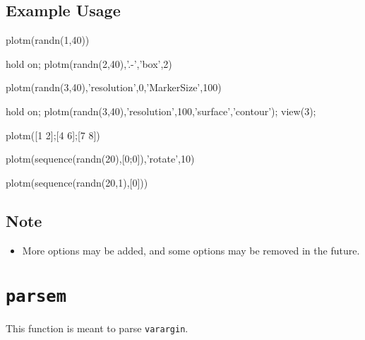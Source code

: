 \subsection*{Example Usage}
\begin{param}
\item[{plotm(randn(1,40))}] 
\item[{hold on; plotm(randn(2,40),'.-','box',2)}]
\item[{plotm(randn(3,40),'resolution',0,'MarkerSize',100)}]
\item[{hold on; plotm(randn(3,40),'resolution',100,'surface','contour'); view(3);}]
\item[{plotm({[1 2];[4 6];[7 8]})}]
\item[{plotm(sequence(randn(20),[0;0]),'rotate',10)}]
\item[{plotm(sequence(randn(20,1),[0]))}]
\end{param}

\subsection*{Note}
\begin{itemize}
    \item More options may be added, and some options may be removed in the future.
\end{itemize}


\section{\texttt{parsem}}\label{parsem}
This function is meant to parse \texttt{varargin}.


